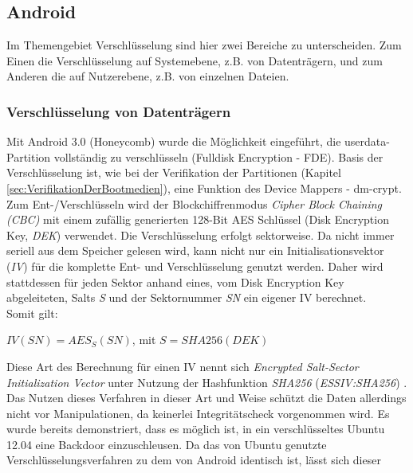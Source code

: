 \subsection{Android}
	Im Themengebiet Verschlüsselung sind hier zwei Bereiche zu unterscheiden. Zum
	Einen die Verschlüsselung auf Systemebene, z.B. von Datenträgern, und zum
	Anderen die auf Nutzerebene, z.B. von einzelnen Dateien.

	\subsubsection{Verschlüsselung von Datenträgern}\label{sec:encrypt-volume}
	Mit Android 3.0 (Honeycomb) wurde die Möglichkeit eingeführt, die
	userdata-Partition vollständig zu verschlüsseln (Fulldisk Encryption - FDE).
	Basis der Verschlüsselung ist, wie bei der Verifikation der Partitionen
	(Kapitel \ref{sec:VerifikationDerBootmedien}), eine Funktion des Device
	Mappers - dm-crypt.\\
	Zum Ent-/Verschlüsseln wird der Blockchiffrenmodus \textit{Cipher Block
	Chaining (CBC)} mit einem zufällig generierten 128-Bit AES Schlüssel (Disk
	Encryption Key, \textit{DEK}) verwendet. Die Verschlüsselung erfolgt
	sektorweise. Da nicht immer seriell aus dem Speicher gelesen wird, kann nicht
	nur ein Initialisationsvektor (\textit{IV}) für die komplette Ent- und
	Verschlüsselung genutzt werden. Daher wird stattdessen für jeden Sektor anhand
	eines, vom Disk Encryption Key abgeleiteten, Salts \textit{S} und der
	Sektornummer \textit{SN} ein eigener IV berechnet.\\
	Somit gilt:
\begin{center}
	\begin{math}
	IV(SN) = AES_{S}(SN)\end{math}, mit \begin{math}S = SHA256(DEK)
	\end{math}\newline
\end{center}
	Diese Art des Berechnung für einen IV nennt sich \textit{Encrypted
	Salt-Sector Initialization Vector} unter Nutzung der Hashfunktion \textit{SHA256}
	(\textit{ESSIV:SHA256}) \cite[S. 259]{Elenkov2014}. Das Nutzen dieses
	Verfahren in dieser Art und Weise schützt die Daten allerdings nicht vor
	Manipulationen, da keinerlei Integritätscheck vorgenommen wird. Es wurde
	bereits demonstriert, dass es möglich ist, in ein verschlüsseltes Ubuntu 12.04
	eine Backdoor einzuschleusen. Da das von Ubuntu genutzte
	Verschlüsselungsverfahren zu dem von Android identisch ist, lässt sich dieser
